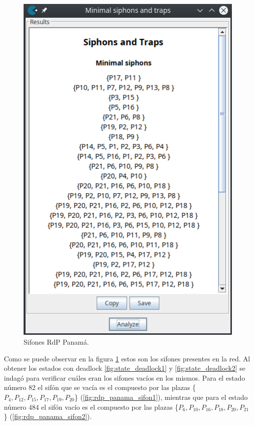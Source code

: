 \begin{figure}[H]
	\centering
	\includegraphics[scale=0.55]{Figures/algoritmo2/sifones_panama.png}
	\caption{Sifones RdP Panamá.}
	\label{fig:rdp_panama_sifones}
  \end{figure}

Como se puede observar en la figura \ref{fig:rdp_panama_sifones} estos son los sifones presentes en la red. Al obtener los estados con deadlock \ref{fig:state_deadlock1} y \ref{fig:state_deadlock2} se indagó para verificar cuáles eran los sifones vacíos en los mismos.
Para el estado número 82 el sifón que se vacía es el compuesto por las plazas \{$P_4, P_{12}, P_{15}, P_{17}, P_{19}, P_{20}$\} (\ref{fig:rdp_panama_sifon1}), mientras que para el estado número 484 el sifón vacío es el compuesto por las plazas \{$P_6, P_{10}, P_{16}, P_{18}, P_{20}, P_{21}$\} (\ref{fig:rdp_panama_sifon2}).

